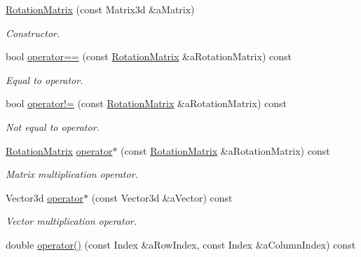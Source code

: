 \begin{DoxyCompactItemize}
\item 
\hyperlink{classlibrary_1_1math_1_1geom_1_1trf_1_1rot_1_1_rotation_matrix_a667d2c05aa5b0cc88775938d11164cdc}{Rotation\+Matrix} (const Matrix3d \&a\+Matrix)
\begin{DoxyCompactList}\small\item\em Constructor. \end{DoxyCompactList}\item 
bool \hyperlink{classlibrary_1_1math_1_1geom_1_1trf_1_1rot_1_1_rotation_matrix_a77fcfc0ab8ee5a5a47320a2315201461}{operator==} (const \hyperlink{classlibrary_1_1math_1_1geom_1_1trf_1_1rot_1_1_rotation_matrix}{Rotation\+Matrix} \&a\+Rotation\+Matrix) const
\begin{DoxyCompactList}\small\item\em Equal to operator. \end{DoxyCompactList}\item 
bool \hyperlink{classlibrary_1_1math_1_1geom_1_1trf_1_1rot_1_1_rotation_matrix_a28996f6b0def32867b58931e1c804b4f}{operator!=} (const \hyperlink{classlibrary_1_1math_1_1geom_1_1trf_1_1rot_1_1_rotation_matrix}{Rotation\+Matrix} \&a\+Rotation\+Matrix) const
\begin{DoxyCompactList}\small\item\em Not equal to operator. \end{DoxyCompactList}\item 
\hyperlink{classlibrary_1_1math_1_1geom_1_1trf_1_1rot_1_1_rotation_matrix}{Rotation\+Matrix} \hyperlink{classlibrary_1_1math_1_1geom_1_1trf_1_1rot_1_1_rotation_matrix_a3c96da7d3e74ab43f2cce4a65bfc934a}{operator$\ast$} (const \hyperlink{classlibrary_1_1math_1_1geom_1_1trf_1_1rot_1_1_rotation_matrix}{Rotation\+Matrix} \&a\+Rotation\+Matrix) const
\begin{DoxyCompactList}\small\item\em Matrix multiplication operator. \end{DoxyCompactList}\item 
Vector3d \hyperlink{classlibrary_1_1math_1_1geom_1_1trf_1_1rot_1_1_rotation_matrix_af4da3ca7389c4126aaf984b6f4340972}{operator$\ast$} (const Vector3d \&a\+Vector) const
\begin{DoxyCompactList}\small\item\em Vector multiplication operator. \end{DoxyCompactList}\item 
double \hyperlink{classlibrary_1_1math_1_1geom_1_1trf_1_1rot_1_1_rotation_matrix_a55edc4e5e8514623bd60f2473ec6e93d}{operator()} (const Index \&a\+Row\+Index, const Index \&a\+Column\+Index) const

\end{DoxyCompactItemize}
